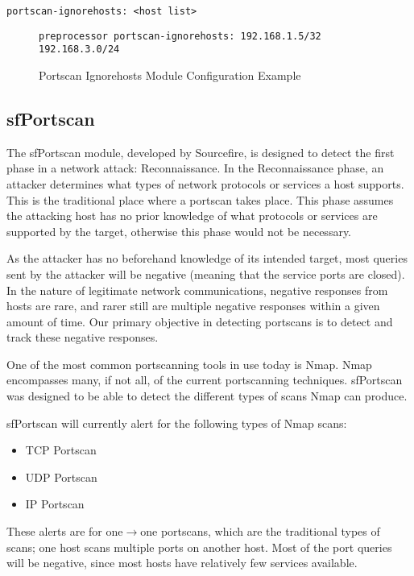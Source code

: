 \documentclass[english]{report}
\begin{document}
\begin{verbatim}
portscan-ignorehosts: <host list>
\end{verbatim}
%
\begin{figure}[!hbpt]
\begin{verbatim}
preprocessor portscan-ignorehosts: 192.168.1.5/32 192.168.3.0/24
\end{verbatim}

\caption{\label{Portscan Ignore Hosts Example}Portscan Ignorehosts Module
Configuration Example}
\end{figure}

\subsection{sfPortscan\label{sfportscan section}}

The sfPortscan module, developed by Sourcefire, is designed to detect the 
first phase in a network attack: Reconnaissance. In the Reconnaissance phase, 
an attacker determines
what types of network protocols or services a host supports. This is
the traditional place where a portscan takes place. This phase assumes
the attacking host has no prior knowledge of what protocols or
services are supported by the target, otherwise this phase would not
be necessary.

As the attacker has no beforehand knowledge of its intended target,
most queries sent by the attacker will be negative (meaning that the
service ports are closed). In the nature of legitimate network
communications, negative responses from hosts are rare, and rarer
still are multiple negative responses within a given amount of time.
Our primary objective in detecting portscans is to detect and track
these negative responses.

One of the most common portscanning tools in use today is Nmap. Nmap
encompasses many, if not all, of the current portscanning techniques.
sfPortscan was designed to be able to detect the different types of
scans Nmap can produce.

sfPortscan will currently alert for the following types of Nmap scans:
\begin{itemize}
\item TCP Portscan
\item UDP Portscan
\item IP Portscan
\end{itemize}

These alerts are for one$\rightarrow$one portscans, which are the traditional
types of scans; one host scans multiple ports on another host. Most of
the port queries will be negative, since most hosts have relatively
few services available.
\end{document}
